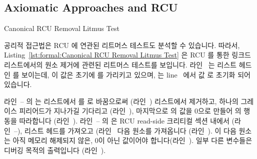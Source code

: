 \subsection{Axiomatic Approaches and RCU}
\label{sec:formal:Axiomatic Approaches and RCU}

\begin{listing}[tb]

\caption{Canonical RCU Removal Litmus Test}
\label{lst:formal:Canonical RCU Removal Litmus Test}
\end{listing}

\begin{lineref}
공리적 접근법은 RCU 에 연관된 리트머스 테스트도 분석할 수 있습니다.
따라서,
Listing~\ref{lst:formal:Canonical RCU Removal Litmus Test}
은 RCU 를 통한 링크드 리스트에서의 원소 제거에 관련된 리트머스 테스트를
보입니다.
라인~ 는 리스트 헤드인  를 보이는데, 이 값은 초기에  를
가리키고 있으며, 는 line~ 에서 값  로 초기화 되어
있습니다.
\iffalse

Axiomatic approaches can also analyze litmus tests involving RCU.
To that end,
Listing~\ref{lst:formal:Canonical RCU Removal Litmus Test}
(\path{C-RCU-remove.litmus})
shows a litmus test corresponding to the canonical RCU-mediated
removal from a linked list.
Line~\lnref{head} shows \co{x} as the list head, initially
referencing \co{y}, which in turn is initialized to the value
\co{2} on line~\lnref{tail:1}.
\fi

	라인~-- 의  는 리스트에서  를 
로 바꿈으로써 (라인~) 리스트에서 제거하고, 하나의 그레이스
피리어드가 지나가길 기다리고 (라인~), 마지막으로  의 값을
0으로 만들어  의 행동을 따라합니다 (라인~).
라인~-- 의  은 RCU read-side 크리티컬 섹션
내에서 (라인~--), 리스트 헤드를 가져오고
(라인~ 다음 원소를 가져옵니다 (라인~).
이 다음 원소는 아직 메모리 해제되지 않은, 0이 아닌 값이어야
합니다(라인~).
일부 다른 변수들은 디버깅 목적의 출력입니다 (라인~).
\iffalse

\co{P0()} on lines~\lnref{P0start}--\lnref{P0end}
removes element \co{y} from the list by replacing it with element \co{z}
(line~\lnref{assignnewtail}),
waits for a grace period (line~\lnref{sync}),
and finally zeroes \co{y} to emulate \co{free()} (line~\lnref{free}).
\co{P1()} on lines~\lnref{P1start}--\lnref{P1end}
executes within an RCU read-side critical section
(lines~\lnref{rl}--\lnref{rul}),
picking up the list head (line~\lnref{rderef}) and then
loading the next element (line~\lnref{read}).
The next element should be non-zero, that is, not yet freed
(line~\lnref{exists_}).
Several other variables are output for debugging purposes
(line~\lnref{locations_}).
\fi


\end{lineref}
